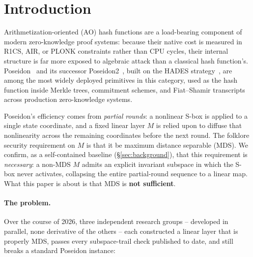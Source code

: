\documentclass[conference]{IEEEtran}
\theoremstyle{definition}
\theoremstyle{plain}
\begin{document}
\section{Introduction}
\label{sec:introduction}

Arithmetization-oriented (AO) hash functions are a load-bearing
component of modern zero-knowledge proof systems: because their native
cost is measured in R1CS, AIR, or PLONK constraints rather than CPU
cycles, their internal structure is far more exposed to algebraic
attack than a classical hash function's. Poseidon~\cite{poseidon2021}
and its successor Poseidon2~\cite{poseidon22023}, built on the HADES
strategy~\cite{hades2020}, are among the most widely deployed primitives
in this category, used as the hash function inside Merkle trees,
commitment schemes, and Fiat--Shamir transcripts across production
zero-knowledge systems.

Poseidon's efficiency comes from \emph{partial rounds}: a nonlinear
S-box is applied to a single state coordinate, and a fixed linear layer
$M$ is relied upon to diffuse that nonlinearity across the remaining
coordinates before the next round. The folklore security requirement on
$M$ is that it be maximum distance separable (MDS). We confirm, as a
self-contained baseline (\S\ref{sec:background}), that this requirement
is \emph{necessary}: a non-MDS $M$ admits an explicit invariant subspace
in which the S-box never activates, collapsing the entire partial-round
sequence to a linear map. What this paper is about is that MDS is
\textbf{not sufficient}.

\paragraph{The problem.} Over the course of 2026, three independent
research groups -- developed in parallel, none derivative of the
others -- each constructed a linear layer that is properly MDS, passes
every subspace-trail check published to date, and still breaks a
standard Poseidon instance:
\end{document}
